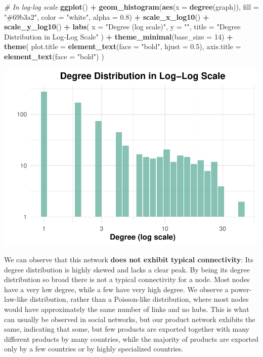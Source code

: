 \documentclass[
]{article}
\newenvironment{Shaded}{\begin{snugshade}}{\end{snugshade}}
\newcommand{\AttributeTok}[1]{\textcolor[rgb]{0.13,0.29,0.53}{#1}}
\newcommand{\CommentTok}[1]{\textcolor[rgb]{0.56,0.35,0.01}{\textit{#1}}}
\newcommand{\DecValTok}[1]{\textcolor[rgb]{0.00,0.00,0.81}{#1}}
\newcommand{\FloatTok}[1]{\textcolor[rgb]{0.00,0.00,0.81}{#1}}
\newcommand{\FunctionTok}[1]{\textcolor[rgb]{0.13,0.29,0.53}{\textbf{#1}}}
\newcommand{\NormalTok}[1]{#1}
\newcommand{\SpecialCharTok}[1]{\textcolor[rgb]{0.81,0.36,0.00}{\textbf{#1}}}
\newcommand{\StringTok}[1]{\textcolor[rgb]{0.31,0.60,0.02}{#1}}
\begin{document}
\begin{Shaded}
\begin{Highlighting}[]
\CommentTok{\# In log{-}log scale}
\FunctionTok{ggplot}\NormalTok{() }\SpecialCharTok{+}
  \FunctionTok{geom\_histogram}\NormalTok{(}\FunctionTok{aes}\NormalTok{(}\AttributeTok{x =} \FunctionTok{degree}\NormalTok{(graph)),}
                 \AttributeTok{fill =} \StringTok{"\#69b3a2"}\NormalTok{, }\AttributeTok{color =} \StringTok{"white"}\NormalTok{, }\AttributeTok{alpha =} \FloatTok{0.8}\NormalTok{) }\SpecialCharTok{+}
  \FunctionTok{scale\_x\_log10}\NormalTok{() }\SpecialCharTok{+}
  \FunctionTok{scale\_y\_log10}\NormalTok{() }\SpecialCharTok{+}
  \FunctionTok{labs}\NormalTok{(}
    \AttributeTok{x =} \StringTok{"Degree (log scale)"}\NormalTok{,}
    \AttributeTok{y =} \StringTok{""}\NormalTok{,}
    \AttributeTok{title =} \StringTok{"Degree Distribution in Log{-}Log Scale"}
\NormalTok{  ) }\SpecialCharTok{+}
  \FunctionTok{theme\_minimal}\NormalTok{(}\AttributeTok{base\_size =} \DecValTok{14}\NormalTok{) }\SpecialCharTok{+}
  \FunctionTok{theme}\NormalTok{(}
    \AttributeTok{plot.title =} \FunctionTok{element\_text}\NormalTok{(}\AttributeTok{face =} \StringTok{"bold"}\NormalTok{, }\AttributeTok{hjust =} \FloatTok{0.5}\NormalTok{),}
    \AttributeTok{axis.title =} \FunctionTok{element\_text}\NormalTok{(}\AttributeTok{face =} \StringTok{"bold"}\NormalTok{)}
\NormalTok{  )}
\end{Highlighting}
\end{Shaded}

\includegraphics{export-network_files/figure-latex/unnamed-chunk-9-2.pdf}

We can observe that this network \textbf{does not exhibit typical
connectivity}: Its degree distribution is highly skewed and lacks a
clear peak. By being its degree distribution so broad there is not a
typical connectivity for a node. Most nodes have a very low degree,
while a few have very high degree. We observe a power-law-like
distribution, rather than a Poisson-like distribution, where most nodes
would have approximately the same number of links and no hubs. This is
what can usually be observed in social networks, but our product network
exhibits the same, indicating that some, but few products are exported
together with many different products by many countries, while the
majority of products are exported only by a few countries or by highly
specialized countries.
\end{document}
